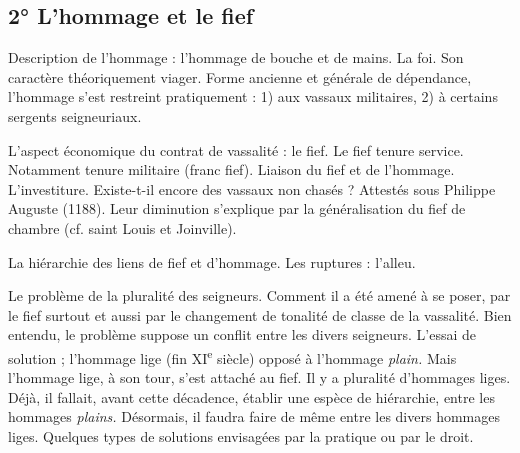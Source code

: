 \documentclass[french,twoside]{book} %
\newcommand{\labelchar}[1]{{\color{rubric}\bf #1}}
\begin{document}
\subsection[2° L’hommage et le fief]{2° L’hommage et le fief}
\noindent \labelchar{a)} Description de l’hommage : l’hommage de bouche et de mains. La foi. Son caractère théoriquement viager. Forme ancienne et générale de dépendance, l’hommage s’est restreint pratiquement : 1) aux vassaux militaires, 2) à certains sergents seigneuriaux.\par
\bigbreak
\noindent \labelchar{b)} L’aspect économique du contrat de vassalité : le fief. Le fief tenure service. Notamment tenure militaire (franc fief). Liaison du fief et de l’hommage. L’investiture. Existe-t-il encore des vassaux non chasés ? Attestés sous Philippe Auguste (1188). Leur diminution s’explique par la généralisation du fief de chambre (cf. saint Louis et Joinville).\par
La hiérarchie des liens de fief et d’hommage. Les ruptures : l’alleu.\par
\bigbreak
\noindent \labelchar{c)} Le problème de la pluralité des seigneurs. Comment il a été amené à se poser, par le fief surtout et aussi par le changement de tonalité de classe de la vassalité. Bien entendu, le problème suppose un conflit entre les divers seigneurs. L’essai de solution ; l’hommage lige (fin XI\textsuperscript{e} siècle) opposé à l’hommage {\itshape plain.} Mais l’hommage lige, à son tour, s’est attaché au fief. Il y a pluralité d’hommages liges. Déjà, il fallait, avant cette décadence, établir une espèce de hiérarchie, entre les hommages {\itshape plains.} Désormais, il faudra faire de même entre les divers hommages liges. Quelques types de solutions envisagées par la pratique ou par le droit.\par
\end{document}
